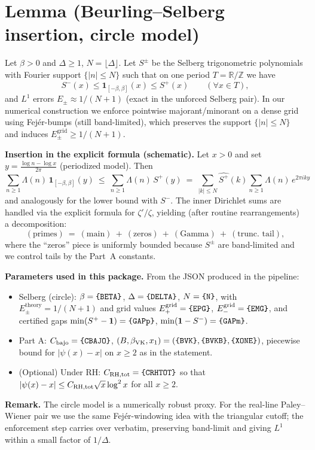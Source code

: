 ﻿\documentclass[11pt]{article}
\newcommand{\Chi}{\mathbf{1}}
\begin{document}
\section*{Lemma (Beurling--Selberg insertion, circle model)}
Let $\beta>0$ and $\Delta\ge1$, $N=\lfloor\Delta\rfloor$. Let $S^\pm$ be the Selberg trigonometric polynomials with
Fourier support $\{|n|\le N\}$ such that on one period $T=\mathbb{R}/\mathbb{Z}$ we have
\[
  S^-(x) \le \Chi_{[-\beta,\beta]}(x) \le S^+(x)\qquad(\forall x\in T),
\]
and $L^1$ errors $E_\pm \approx 1/(N+1)$ (exact in the unforced Selberg pair). In our numerical construction we enforce
pointwise majorant/minorant on a dense grid using Fejér-bumps (still band-limited), which preserves the support
$\{|n|\le N\}$ and induces $E_\pm^{\text{grid}}\ge 1/(N+1)$.

\medskip
\noindent\textbf{Insertion in the explicit formula (schematic).}
Let $x>0$ and set $y=\frac{\log n - \log x}{2\pi}$ (periodized model).
Then
\[
  \sum_{n\ge1} \Lambda(n)\, \Chi_{[-\beta,\beta]}(y)
  \ \le\ \sum_{n\ge1} \Lambda(n)\, S^+(y)
  \ =\ \sum_{|k|\le N} \widehat{S^+}(k) \sum_{n\ge1} \Lambda(n)\, e^{2\pi i k y}
\]
and analogously for the lower bound with $S^-$. The inner Dirichlet sums are handled via the explicit formula
for $\zeta'/\zeta$, yielding (after routine rearrangements) a decomposition:
\[
  (\text{primes})\ =\ (\text{main})\ +\ (\text{zeros})\ +\ (\text{Gamma})\ +\ (\text{trunc. tail}),
\]
where the ``zeros'' piece is uniformly bounded because $S^\pm$ are band-limited and we control tails by the Part~A constants.

\medskip
\noindent\textbf{Parameters used in this package.}
From the JSON produced in the pipeline:
\begin{itemize}
  \item Selberg (circle): $\beta = \verb|{BETA}|$, $\Delta=\verb|{DELTA}|$, $N=\verb|{N}|$,
        with $E_\pm^{\text{theory}} = 1/(N+1)$ and grid values
        $E_+^{\text{grid}}=\verb|{EPG}|$, $E_-^{\text{grid}}=\verb|{EMG}|$,
        and certified gaps $\min(S^+-\Chi)=\verb|{GAPp}|$, $\min(\Chi-S^-)=\verb|{GAPm}|$.
  \item Part A: $C_{\text{bajo}}=\verb|{CBAJO}|$, $(B,\beta_{\rm VK},x_1)=(\verb|{BVK}|,\verb|{BVKB}|,\verb|{XONE}|)$,
        piecewise bound for $|\psi(x)-x|$ on $x\ge2$ as in the statement.
  \item (Optional) Under RH: $C_{\rm RH,tot}=\verb|{CRHTOT}|$ so that
        $|\psi(x)-x|\le C_{\rm RH,tot}\sqrt{x}\log^2 x$ for all $x\ge2$.
\end{itemize}

\medskip
\noindent\textbf{Remark.} The circle model is a numerically robust proxy. For the real-line Paley--Wiener pair
we use the same Fejér-windowing idea with the triangular cutoff; the enforcement step carries over verbatim, preserving
band-limit and giving $L^1$ within a small factor of $1/\Delta$.
\end{document}
